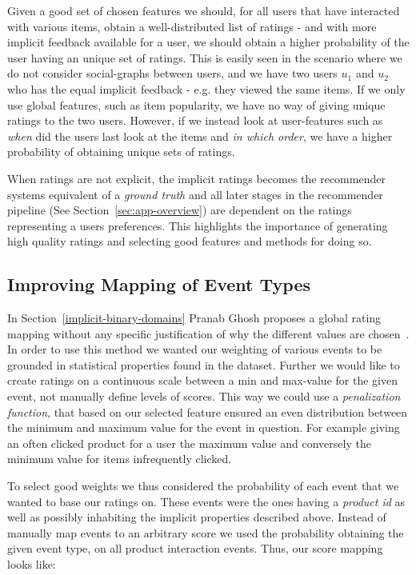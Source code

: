 Given a good set of chosen features we should, for all users that have
interacted with various items, obtain a well-distributed list of ratings - and
with more implicit feedback available for a user, we should obtain a higher
probability of the user having an unique set of ratings. This is easily seen in
the scenario where we do not consider social-graphs between users, and we have
two users $u_1$ and $u_2$ who has the equal implicit feedback - e.g. they
viewed the same items. If we only use global features, such as item popularity,
we have no way of giving unique ratings to the two users. However, if we
instead look at user-features such as \textit{when} did the users last look at
the items and \textit{in which order}, we have a higher probability of
obtaining unique sets of ratings.

When ratings are not explicit, the implicit ratings becomes the recommender
systems equivalent of a \textit{ground truth} and all later stages in the
recommender pipeline (See Section~\ref{sec:app-overview}) are dependent on the
ratings representing a users preferences. This highlights the importance of
generating high quality ratings and selecting good features and methods for
doing so.

\subsection{Improving Mapping of Event Types}

In Section~\ref{implicit-binary-domains} Pranab Ghosh proposes a global rating
mapping without any specific justification of why the different values are
chosen~\cite{pkghost2014implicit}. In order to use this method we wanted our
weighting of various events to be grounded in statistical properties found in
the dataset. Further we would like to create ratings on a continuous scale
between a min and max-value for the given event, not manually define levels of
scores. This way we could use a \textit{penalization function}, that based on
our selected feature ensured an even distribution between the minimum and
maximum value for the event in question. For example giving an often clicked
product for a user the maximum value and conversely the minimum value for
items infrequently clicked.

To select good weights we thus considered the probability of each event that we
wanted to base our ratings on. These events were the ones having a
\textit{product id} as well as possibly inhabiting the implicit properties
described above. Instead of manually map events to an arbitrary score we used
the probability obtaining the given event type, on all product interaction
events. Thus, our score mapping looks like:

